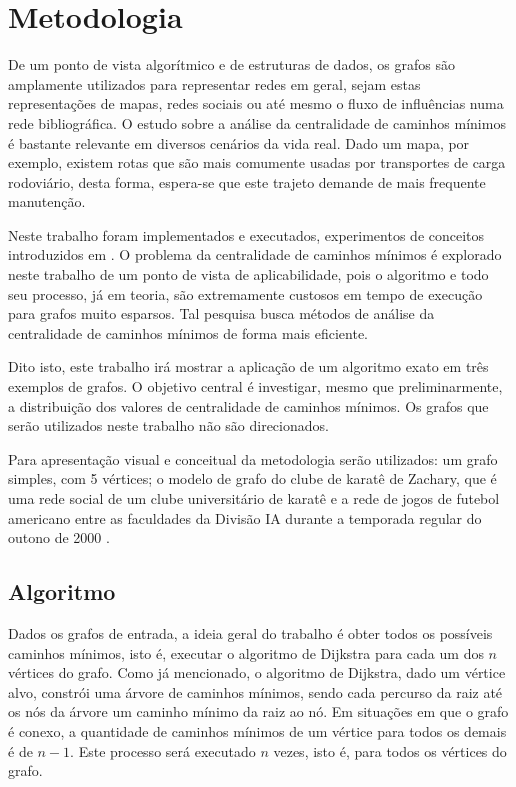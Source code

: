 \graphicspath{{\currfiledir/images/}}

\chapter{Metodologia}
De um ponto de vista algorítmico e de estruturas de dados, os grafos são amplamente utilizados para representar redes em geral, sejam estas representações de mapas, redes sociais ou até mesmo o fluxo de influências numa rede bibliográfica. O estudo sobre a análise da centralidade de caminhos mínimos é bastante relevante em diversos cenários da vida real. Dado um mapa, por exemplo, existem rotas que são mais comumente usadas por transportes de carga rodoviário, desta forma, espera-se que este trajeto demande de mais frequente manutenção.

Neste trabalho foram implementados e executados, experimentos de conceitos introduzidos em \cite{alane2021}. O problema da centralidade de caminhos mínimos é explorado neste trabalho de um ponto de vista de aplicabilidade, pois o algoritmo e todo seu processo, já em teoria, são extremamente custosos em tempo de execução para grafos muito esparsos. Tal pesquisa busca métodos de análise da centralidade de caminhos mínimos de forma mais eficiente.

Dito isto, este trabalho irá mostrar a aplicação de um algoritmo exato em três exemplos de grafos. O objetivo central é investigar, mesmo que preliminarmente, a distribuição dos valores de centralidade de caminhos mínimos. Os grafos que serão utilizados neste trabalho não são direcionados.

Para apresentação visual e conceitual da metodologia serão utilizados: um grafo simples, com 5 vértices; o modelo de grafo do clube de karatê de Zachary, que é uma rede social de um clube universitário de karatê \cite{zachary2009} e a rede de jogos de futebol americano entre as faculdades da Divisão IA durante a temporada regular do outono de 2000 \cite{networkxfootball2021}.

\section{Algoritmo}
Dados os grafos de entrada, a ideia geral do trabalho é obter todos os possíveis caminhos mínimos, isto é, executar o algoritmo de Dijkstra para cada um dos $n$ vértices do grafo. Como já mencionado, o algoritmo de Dijkstra, dado um vértice alvo, constrói uma árvore de caminhos mínimos, sendo cada percurso da raiz até os nós da árvore um caminho mínimo da raiz ao nó. Em situações em que o grafo é conexo, a quantidade de caminhos mínimos de um vértice para todos os demais é de $n - 1$. Este processo será executado $n$ vezes, isto é, para todos os vértices do grafo.


